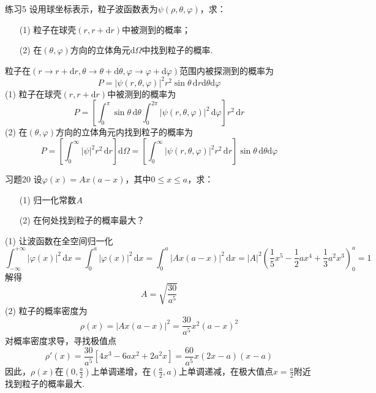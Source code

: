 \begin{question}{练习5}
    设用球坐标表示，粒子波函数表为$\psi(\rho, \theta, \varphi)$，求：
    \begin{enumerate}
        \item[(1)] 粒子在球壳$(r, r+\mathrm{d}r)$中被测到的概率；
        \item[(2)] 在$(\theta, \varphi)$方向的立体角元$\mathrm{d}\Omega$中找到粒子的概率.
    \end{enumerate}
\end{question}
\begin{solution}
    粒子在$(r\to r+\mathrm{d}r, \theta \to \theta+\mathrm{d}\theta, \varphi \to \varphi+\mathrm{d}\varphi)$范围内被探测到的概率为
    $$
        P = \left|\psi(r, \theta, \varphi)\right|^2r^2\sin\theta \,\mathrm{d}r\mathrm{d}\theta\mathrm{d}\varphi
    $$
    (1) 粒子在球壳$(r, r+\mathrm{d}r)$中被测到的概率为
    $$
        P=\left[\int_{0}^{\pi}\sin\theta\,\mathrm{d}\theta\int_{0}^{2\pi}\left|\psi(r, \theta, \varphi)\right|^2\,\mathrm{d}\varphi\right]r^2\,\mathrm{d}r
    $$
    (2) 在$(\theta, \varphi)$方向的立体角元内找到粒子的概率为
    $$
        P=\left[\int_{0}^{\infty}|\psi|^2r^2\,\mathrm{d}r\right]\mathrm{d}\Omega
        =\left[\int_{0}^{\infty}\left|\psi(r, \theta, \varphi)\right|^2r^2\,\mathrm{d}r\right]\sin\theta\,\mathrm{d}\theta\mathrm{d}\varphi
    $$
\end{solution}


\begin{question}{习题20}
    设$\varphi(x)=Ax(a-x)$，其中$0 \leqslant x \leqslant a$，求：
    \begin{enumerate}
        \item[(1)] 归一化常数$A$
        \item[(2)] 在何处找到粒子的概率最大？
    \end{enumerate}
\end{question}
\begin{solution}
    (1) 让波函数在全空间归一化
    $$
        \int_{-\infty}^{+\infty}|\varphi(x)|^2\,\mathrm{d}x
        = \int_0^a |\varphi(x)|^2\,\mathrm{d}x
        = \int_0^a |Ax(a-x)|^2\,\mathrm{d}x
        = |A|^2\left(\frac15x^5-\frac12ax^4+\frac13a^2x^3\right)_0^a
        = 1
    $$
    解得
    $$
        A=\sqrt{\frac{30}{a^5}}
    $$
    (2) 粒子的概率密度为
    $$
        \rho(x) = |Ax(a-x)|^2 = \frac{30}{a^5}x^2(a-x)^2
    $$
    对概率密度求导，寻找极值点
    $$
        \rho'(x)=\frac{30}{a^5}[4x^3-6ax^2+2a^2x]=\frac{60}{a^5}x(2x-a)(x-a)
    $$
    因此，$\rho(x)$在$\left(0,\frac{a}{2}\right)$上单调递增，在$\left(\frac{a}{2},a\right)$上单调递减，在极大值点$x=\frac{a}{2}$附近找到粒子的概率最大.
\end{solution}


